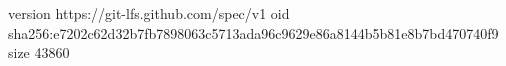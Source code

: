 version https://git-lfs.github.com/spec/v1
oid sha256:e7202c62d32b7fb7898063c5713ada96c9629e86a8144b5b81e8b7bd470740f9
size 43860
